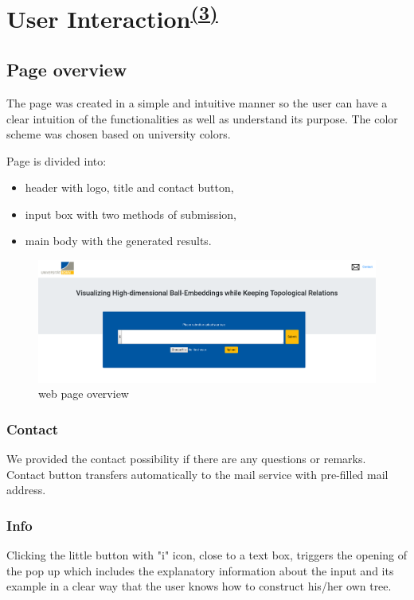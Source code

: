 \section[User Interaction]{User Interaction\textsuperscript{\hyperref[Joanna]{(3)}}}

\subsection{Page overview}
The page was created in a simple and intuitive manner so the user can have a clear intuition of the functionalities as well as understand its purpose. The color scheme was chosen based on university colors. 

Page is divided into: 
\begin{itemize}
	\item header with logo, title and contact button,
	\item input box with two methods of submission,
	\item main body with the generated results.
\end{itemize}


\begin{figure}[H]
	\includegraphics[width=\textwidth]{res/page.png}
	\caption{web page overview}
	\label{fig:page}
\end{figure}


\subsubsection{Contact}
We provided the contact possibility if there are any questions or remarks. Contact button transfers automatically to the mail service with pre-filled mail address.

\subsubsection{Info}
Clicking the little button with "i" icon, close to a text box, triggers the opening of the pop up which includes the explanatory information about the input and its example in a clear way that the user knows how to construct his/her own tree. 

